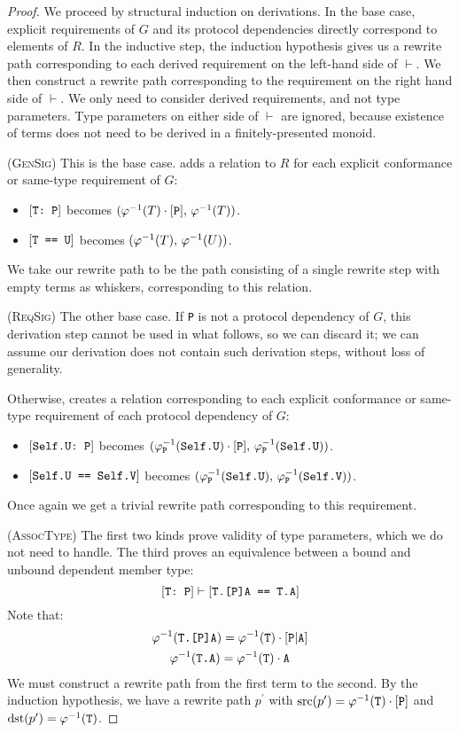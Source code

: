 \documentclass[../generics]{subfiles}
\begin{document}
\begin{proof}
We proceed by structural induction on derivations. In the base case, explicit requirements of $G$ and its protocol dependencies directly correspond to elements of $R$. In the inductive step, the induction hypothesis gives us a rewrite path corresponding to each derived requirement on the left-hand side of $\vdash$. We then construct a rewrite path corresponding to the requirement on the right hand side of $\vdash$. We only need to consider derived requirements, and not type parameters. Type parameters on either side of $\vdash$ are ignored, because existence of terms does not need to be derived in a finitely-presented monoid.

(\textsc{GenSig}) This is the base case.  adds a relation to $R$ for each explicit conformance or same-type requirement of $G$:
\begin{itemize}
\item $[\texttt{T:~P}]$ becomes $(\varphi^{-1}(T)\cdot[\texttt{P}],\,\varphi^{-1}(T))$.
\item $[\texttt{T == U}]$ becomes $(\varphi^{-1}(T),\,\varphi^{-1}(U))$.
\end{itemize}
We take our rewrite path to be the path consisting of a single rewrite step with empty terms as whiskers, corresponding to this relation.

(\textsc{ReqSig}) The other base case. If \texttt{P} is not a protocol dependency of $G$, this derivation step cannot be used in what follows, so we can discard it; we can assume our derivation does not contain such derivation steps, without loss of generality.

Otherwise,  creates a relation corresponding to each explicit conformance or same-type requirement of each protocol dependency of $G$:
\begin{itemize}
\item $[\texttt{Self.U:~P}]$ becomes $(\varphi^{-1}_\texttt{P}(\texttt{Self.U})\cdot[\texttt{P}],\,\varphi^{-1}_\texttt{P}(\texttt{Self.U}))$.
\item $[\texttt{Self.U == Self.V}]$ becomes $(\varphi^{-1}_\texttt{P}(\texttt{Self.U}),\,\varphi^{-1}_\texttt{P}(\texttt{Self.V}))$.
\end{itemize}
Once again we get a trivial rewrite path corresponding to this requirement.

(\textsc{AssocType})
The first two kinds prove validity of type parameters, which we do not need to handle. The third proves an equivalence between a bound and unbound dependent member type:
\[[\texttt{T:~P}]\vdash[\texttt{T.[P]A == T.A}]\]
Note that:
\begin{gather*}
\varphi^{-1}(\texttt{T.[P]A})=\varphi^{-1}(\texttt{T})\cdot[\texttt{P}|\texttt{A}]\\
\varphi^{-1}(\texttt{T.A})=\varphi^{-1}(\texttt{T})\cdot\texttt{A}
\end{gather*}
We must construct a rewrite path from the first term to the second. By the induction hypothesis, we have a rewrite path $p^\prime$ with $\operatorname{src}(p^\prime)=\varphi^{-1}(\texttt{T})\cdot[\texttt{P}]$ and $\operatorname{dst}(p^\prime)=\varphi^{-1}(\texttt{T})$.


\end{proof}
\end{document}
